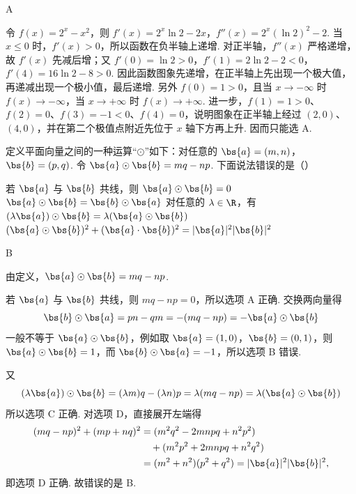 \begin{answer}
A
\end{answer}

\begin{solution}
令 \(f(x)=2^x-x^2\)，则
\(f'(x)=2^x\ln2-2x\)，\(f''(x)=2^x(\ln2)^2-2\).
当 \(x\leqslant0\) 时，\(f'(x)>0\)，所以函数在负半轴上递增. 对正半轴，\(f''(x)\) 严格递增，故 \(f'(x)\) 先减后增；又
\(f'(0)=\ln2>0\)，\(f'(1)=2\ln2-2<0\)，\(f'(4)=16\ln2-8>0\).
因此函数图象先递增，在正半轴上先出现一个极大值，再递减出现一个极小值，最后递增. 另外 \(f(0)=1>0\)，且当 \(x\to-\infty\) 时 \(f(x)\to-\infty\)，当 \(x\to+\infty\) 时 \(f(x)\to+\infty\). 进一步，\(f(1)=1>0\)、\(f(2)=0\)、\(f(3)=-1<0\)、\(f(4)=0\)，说明图象在正半轴上经过 \((2,0)\)、\((4,0)\)，并在第二个极值点附近先位于 \(x\) 轴下方再上升. 因而只能选 A.
\end{solution}

\begin{problem}
定义平面向量之间的一种运算“\(\odot\)”如下：对任意的 \(\bs{a} = (m, n)\)，\(\bs{b} = (p, q)\). 令 \(\bs{a} \odot \bs{b} = mq - np\). 下面说法错误的是（\quad）

\choices
    {若 \(\bs{a}\) 与 \(\bs{b}\) 共线，则 \(\bs{a} \odot \bs{b} = 0\)}
    {\(\bs{a} \odot \bs{b} = \bs{b} \odot \bs{a}\)}
    {对任意的 \(\lambda \in \R\)，有 \((\lambda \bs{a}) \odot \bs{b} = \lambda (\bs{a} \odot \bs{b})\)}
    {\((\bs{a}\odot \bs{b})^2 + (\bs{a}\cdot \bs{b})^2 = |\bs{a}|^2 |\bs{b}|^2\)}
\end{problem}

\begin{answer}
B
\end{answer}

\begin{solution}
由定义，\(\bs{a}\odot\bs{b}=mq-np\).

若 \(\bs{a}\) 与 \(\bs{b}\) 共线，则 \(mq-np=0\)，所以选项 A 正确. 交换两向量得
\[
\bs{b}\odot\bs{a}=pn-qm=-(mq-np)=-\bs{a}\odot\bs{b}
\]
一般不等于 \(\bs{a}\odot\bs{b}\)，例如取 \(\bs{a}=(1,0)\)，\(\bs{b}=(0,1)\)，则 \(\bs{a}\odot\bs{b}=1\)，而 \(\bs{b}\odot\bs{a}=-1\)，所以选项 B 错误.

又
\[
(\lambda\bs{a})\odot\bs{b}=(\lambda m)q-(\lambda n)p=\lambda(mq-np)=\lambda(\bs{a}\odot\bs{b})
\]
所以选项 C 正确. 对选项 D，直接展开左端得
\[
\begin{aligned}
(mq-np)^2+(mp+nq)^2
&=(m^2q^2-2mnpq+n^2p^2) \\
&\quad +(m^2p^2+2mnpq+n^2q^2) \\
&=(m^2+n^2)(p^2+q^2)=|\bs{a}|^2|\bs{b}|^2,
\end{aligned}
\]
即选项 D 正确. 故错误的是 B.
\end{solution}

